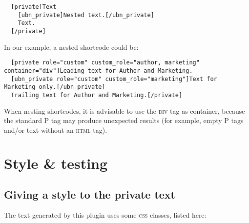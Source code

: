 \begin{lstlisting}
  [private]Text
    [ubn_private]Nested text.[/ubn_private]
    Text.
  [/private]
\end{lstlisting}

In our example, a nested shortcode could be:

\begin{lstlisting}
  [private role="custom" custom_role="author, marketing" container="div"]Leading text for Author and Marketing.
  [ubn_private role="custom" custom_role="marketing"]Text for Marketing only.[/ubn_private]
  Trailing text for Author and Marketing.[/private]
\end{lstlisting}

When nesting shortcodes,  it is advisable to use the \textsc{div} tag as container, because
the standard P tag may produce unexpected results (for example, empty P tags
and/or text without an \textsc{html} tag).

\part{Style \& testing}

\chapter{Giving a style to the private text}

The text generated by this plugin uses some \textsc{css} classes, listed here:

